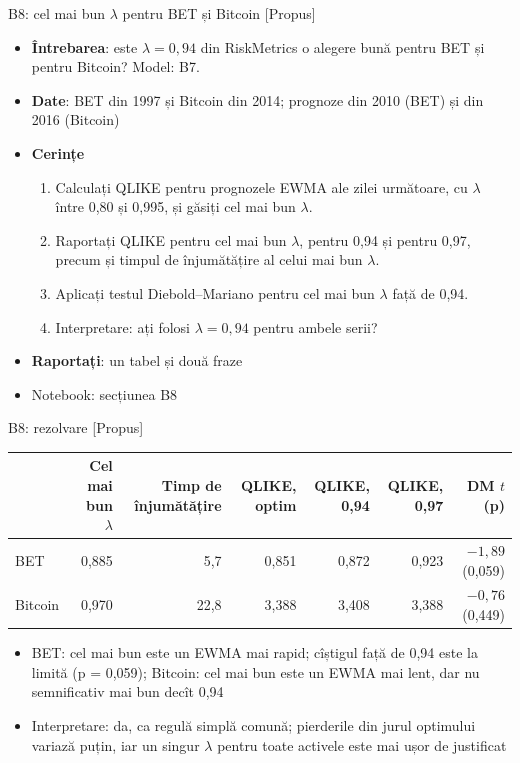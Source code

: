 \begin{frame}{B8: cel mai bun $\lambda$ pentru BET și Bitcoin [Propus]}
\itemsize{\footnotesize}
\begin{itemize}
\item \textbf{Întrebarea}: este $\lambda = 0{,}94$ din RiskMetrics o alegere bună pentru BET și pentru Bitcoin? Model: B7.
\item \textbf{Date}: BET din 1997 și Bitcoin din 2014; prognoze din 2010 (BET) și din 2016 (Bitcoin)
\item \textbf{Cerințe}
\begin{enumerate}
    \item Calculați QLIKE pentru prognozele EWMA ale zilei următoare, cu $\lambda$ între 0,80 și 0,995, și găsiți cel mai bun $\lambda$.
    \item Raportați QLIKE pentru cel mai bun $\lambda$, pentru 0,94 și pentru 0,97, precum și timpul de înjumătățire al celui mai bun $\lambda$.
    \item Aplicați testul Diebold--Mariano pentru cel mai bun $\lambda$ față de 0,94.
    \item Interpretare: ați folosi $\lambda = 0{,}94$ pentru ambele serii?
\end{enumerate}
\item \textbf{Raportați}: un tabel și două fraze
\item Notebook: secțiunea B8
\end{itemize}
\end{frame}

\ifsolutions
\begin{frame}{B8: rezolvare [Propus]}
\itemsize{\footnotesize}
\begin{center}
\footnotesize
\begin{tabular}{lrrrrrr}
\toprule
& \textbf{Cel mai bun} $\lambda$ & \textbf{Timp de înjumătățire} & QLIKE, \textbf{optim} & QLIKE, 0,94 & QLIKE, 0,97 & DM $t$ (p) \\
\midrule
BET & 0{,}885 & 5{,}7 & 0{,}851 & 0{,}872 & 0{,}923 & ${-1{,}89}$ (0{,}059) \\
Bitcoin & 0{,}970 & 22{,}8 & 3{,}388 & 3{,}408 & 3{,}388 & ${-0{,}76}$ (0{,}449) \\
\bottomrule
\end{tabular}
\end{center}
\begin{itemize}
    \item BET: cel mai bun este un EWMA mai rapid; cîștigul față de 0,94 este la limită (p = 0{,}059); Bitcoin: cel mai bun este un EWMA mai lent, dar nu semnificativ mai bun decît 0,94
    \item Interpretare: da, ca regulă simplă comună; pierderile din jurul optimului variază puțin, iar un singur $\lambda$ pentru toate activele este mai ușor de justificat
\end{itemize}
\end{frame}
\fi


